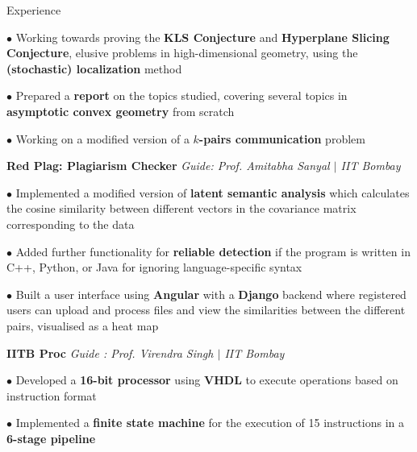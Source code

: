 \begin{rubric}{Experience}
    \entry*[2021]  
        
        $\bullet$ Working towards proving the \textbf{KLS Conjecture} and \textbf{Hyperplane Slicing Conjecture}, elusive problems in high-dimensional geometry, using the \textbf{(stochastic) localization} method

        $\bullet$ Prepared a \textbf{report} on the topics studied, covering several topics in \textbf{asymptotic convex geometry} from scratch

        $\bullet$ Working on a modified version of a \textbf{$k$-pairs communication} problem

    \entry*[2020] \textbf{Red Plag: Plagiarism Checker} \hfill \emph{Guide: Prof. Amitabha Sanyal $\mid$ IIT Bombay}
	    
	    $\bullet$ Implemented a modified version of \textbf{latent semantic analysis} which calculates the cosine similarity between different vectors in the covariance matrix corresponding to the data
        
        $\bullet$ Added further functionality for \textbf{reliable detection} if the program is written in C++, Python, or Java for ignoring language-specific syntax

        $\bullet$ Built a user interface using \textbf{Angular} with a \textbf{Django} backend where registered users can upload and process files and view the similarities between the different pairs, visualised as a heat map

    \entry*[2021] \textbf{IITB Proc} \hfill \emph{Guide : Prof. Virendra Singh $\mid$ IIT Bombay}
        
        $\bullet$ Developed a \textbf{16-bit processor} using \textbf{VHDL} to execute operations based on instruction format

        $\bullet$ Implemented a \textbf{finite state machine} for the execution of 15 instructions in a \textbf{6-stage pipeline}


        
        
\end{rubric}
